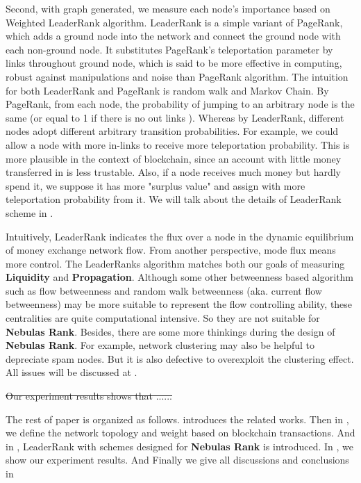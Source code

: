 Second, with graph generated, we measure each node's importance based on Weighted LeaderRank algorithm\cite{Chen2013}\cite{Li2014}. LeaderRank is a simple variant of PageRank, which adds a ground node into the network and connect the ground node with each non-ground node. It substitutes PageRank's teleportation parameter by links throughout ground node, which is said to be more effective in computing, robust against manipulations and noise than PageRank algorithm\cite{Chen2013}. The intuition for both LeaderRank and PageRank is random walk and Markov Chain. By PageRank, from each node, the probability of jumping to an arbitrary node is the same (or equal to 1 if there is no out links \cite{Kim2002}). Whereas by LeaderRank\cite{Li2014}\cite{Chen2013}, different nodes adopt different arbitrary transition probabilities. For example, we could allow a node with more in-links to receive more teleportation probability. This is more plausible in the context of blockchain, since an account with little money transferred in is less trustable. Also, if a node receives much money but hardly spend it, we suppose it has more "surplus value" and assign with more teleportation probability from it. We will talk about the details of LeaderRank scheme in .

Intuitively, LeaderRank indicates the flux over a node in the dynamic equilibrium of money exchange network flow. From another perspective, mode flux means more control. The LeaderRanks algorithm matches both our goals of measuring \textbf{Liquidity} and \textbf{Propagation}. Although some other betweenness based algorithm such as flow betweenness\cite{freeman1991centrality} and random walk betweenness (aka. current flow betweenness)\cite{newman2005measure} may be more suitable to represent the flow controlling ability, these centralities are quite computational intensive. So they are not suitable for \textbf{Nebulas Rank}. Besides, there are some more thinkings during the design of \textbf{Nebulas Rank}. For example, network clustering may also be helpful to depreciate spam nodes\cite{Nikolakopoulos2013}. But it is also defective to overexploit the clustering effect. All issues will be discussed at .

\st{Our experiment results shows that ...... }

The rest of paper is organized as follows.  introduces the related works. Then in , we define the network topology and weight based on blockchain transactions. And in , LeaderRank with schemes designed for \textbf{Nebulas Rank} is introduced. In , we show our experiment results. And Finally we give all discussions and conclusions in 

